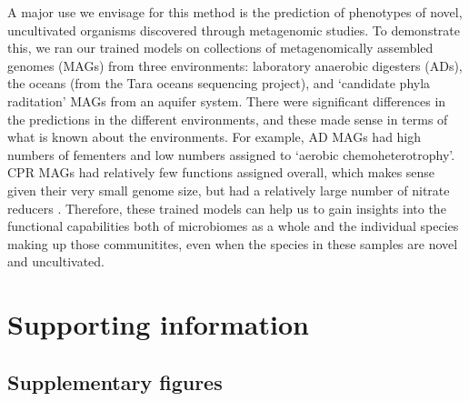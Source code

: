 \documentclass[10pt,letterpaper]{article}
\begin{document}
A major use we envisage for this method is the prediction of phenotypes of novel, uncultivated organisms discovered through metagenomic studies. To demonstrate this, we ran our trained models on collections of metagenomically assembled genomes (MAGs) from three environments: laboratory anaerobic digesters (ADs), the oceans (from the Tara oceans sequencing project), and `candidate phyla raditation' MAGs from an aquifer system. There were significant differences in the predictions in the different environments, and these made sense in terms of what is known about the environments. For example, AD MAGs had high numbers of fementers and low numbers assigned to `aerobic chemoheterotrophy'. CPR MAGs had relatively few functions assigned overall, which makes sense given their very small genome size, but had a relatively large number of nitrate reducers \cite{Danczak2017}. Therefore, these trained models can help us to gain insights into the functional capabilities both of microbiomes as a whole and the individual species making up those communitites, even when the species in these samples are novel and uncultivated.


\section*{Supporting information}

\subsection*{Supplementary figures}

\renewcommand{\thefigure}{S\arabic{figure}}

\setcounter{figure}{0}
\end{document}
